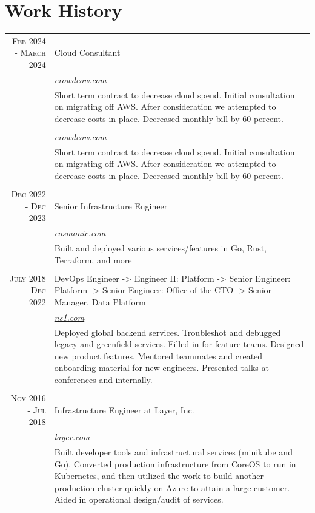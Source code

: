 \documentclass[a4paper, 10pt, onepage]{article} %
\begin{document}
\section{Work History}
\begin{tabular}{r|p{10cm}}
\textsc{Feb 2024 - March 2024} & {Cloud Consultant}\\
&\small\emph{\href{https://crowdcow.com}{crowdcow.com}}\\
&\footnotesize{Short term contract to decrease cloud spend. Initial consultation on migrating off AWS. After consideration we attempted to decrease costs in place. Decreased monthly bill by 60 percent.}\\

\multicolumn{2}{c}{}\\
&\small\emph{\href{https://crowdcow.com}{crowdcow.com}}\\
&\footnotesize{Short term contract to decrease cloud spend. Initial consultation on migrating off AWS. After consideration we attempted to decrease costs in place. Decreased monthly bill by 60 percent.}\\

\multicolumn{2}{c}{}\\
\textsc{Dec 2022 - Dec 2023} & {Senior Infrastructure Engineer}\\
&\small\emph{\href{https://cosmonic.com}{cosmonic.com}}\\
&\footnotesize{Built and deployed various services/features in Go, Rust, Terraform, and more}\\

\multicolumn{2}{c}{}\\
\textsc{July 2018 - Dec 2022} & {DevOps Engineer -> Engineer II: Platform -> Senior Engineer: Platform -> Senior Engineer: Office of the CTO -> Senior Manager, Data Platform}\\
&\small\emph{\href{https://ns1.com}{ns1.com}}\\
&\footnotesize{Deployed global backend services. Troubleshot and debugged legacy and greenfield services. Filled in for feature teams. Designed new product features. Mentored teammates and created onboarding material for new engineers. Presented talks at conferences and internally.}\\

\multicolumn{2}{c}{}\\
\textsc{Nov 2016 - Jul 2018} & {Infrastructure Engineer at Layer, Inc.}\\
&\small\emph{\href{https://layer.com}{layer.com}}\\
&\footnotesize{Built developer tools and infrastructural services (minikube and Go). Converted production infrastructure from CoreOS to run in Kubernetes, and then utilized the work to build another production cluster quickly on Azure to attain a large customer. Aided in operational design/audit of services.}\\


\end{tabular}
\end{document}
